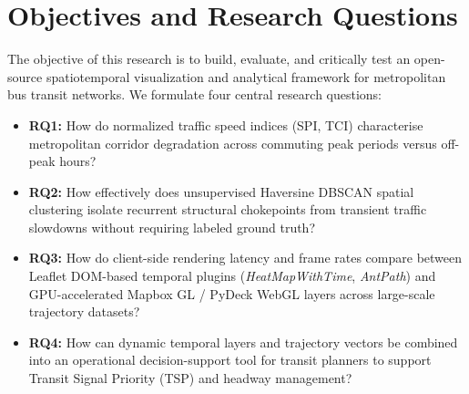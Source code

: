 \documentclass[conference]{IEEEtran}
\begin{document}
\section{Objectives and Research Questions}
The objective of this research is to build, evaluate, and critically test an open-source spatiotemporal visualization and analytical framework for metropolitan bus transit networks. We formulate four central research questions:
\begin{itemize}
    \item \textbf{RQ1:} How do normalized traffic speed indices (SPI, TCI) characterise metropolitan corridor degradation across commuting peak periods versus off-peak hours?
    \item \textbf{RQ2:} How effectively does unsupervised Haversine DBSCAN spatial clustering isolate recurrent structural chokepoints from transient traffic slowdowns without requiring labeled ground truth?
    \item \textbf{RQ3:} How do client-side rendering latency and frame rates compare between Leaflet DOM-based temporal plugins (\textit{HeatMapWithTime}, \textit{AntPath}) and GPU-accelerated Mapbox GL / PyDeck WebGL layers across large-scale trajectory datasets?
    \item \textbf{RQ4:} How can dynamic temporal layers and trajectory vectors be combined into an operational decision-support tool for transit planners to support Transit Signal Priority (TSP) and headway management?
\end{itemize}
\end{document}
